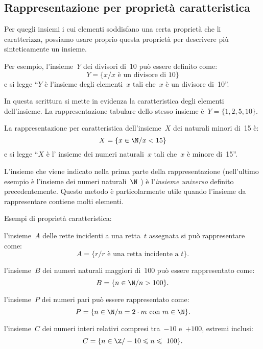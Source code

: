 
\subsection{Rappresentazione per proprietà caratteristica}
\label{subsec:rappr_caratteristica}

Per quegli insiemi i cui elementi soddisfano una certa proprietà che
li caratterizza, possiamo usare proprio questa proprietà per
descrivere più sinteticamente un insieme.

Per esempio, l'insieme~\(Y\) dei divisori di~10 può essere definito come: 
\[Y=\{x / x \text{ è un divisore di }10\}\]
e si legge ``\(Y\) è l'insieme degli elementi~\(x\) tali che~\(x\) è un 
divisore di~10''.

In questa scrittura si mette in evidenza la caratteristica degli elementi 
dell'insieme.
La rappresentazione tabulare dello stesso insieme è~\(Y=\{1, 2, 5, 10\}\).

La rappresentazione per caratteristica dell'insieme~\(X\)
dei naturali minori di~15 è: \[X=\{x\in\N/x<15\}\]
e si legge ``\(X\) è l' insieme dei numeri naturali~\(x\) tali che~\(x\) è 
minore di~15''.

L'insieme che viene indicato nella prima parte della rappresentazione 
(nell'ultimo esempio è l'insieme dei numeri naturali~\(\N\) ) è 
l'\textit{insieme universo} definito precedentemente.
Questo metodo è particolarmente utile quando l'insieme da rappresentare 
contiene molti elementi.

 \begin{esempio}
 Esempi di proprietà caratteristica:
 \begin{enumeratea}
\item l'insieme~\(A\) delle rette incidenti a una retta~\(t\) assegnata si 
può rappresentare come:
\[A=\{r / r\text{ è una retta incidente a } t\}.\]
\item l'insieme~\(B\) dei numeri naturali maggiori di~100 può essere 
 rappresentato come:
\[B=\{n\in\N/n>100\}.\]
\item l'insieme~\(P\) dei numeri pari può essere rappresentato come:
\[P=\{n\in\N/n=2\cdot m\text{ con }m\in\N\}.\]
\item l'insieme~\(C\) dei numeri interi relativi compresi tra~\(-10\) 
e~\(+100\), 
 estremi inclusi:
\[C=\{n\in\Z/-10\leqslant n\leqslant~100\}.\]
\end{enumeratea}
 \end{esempio}

